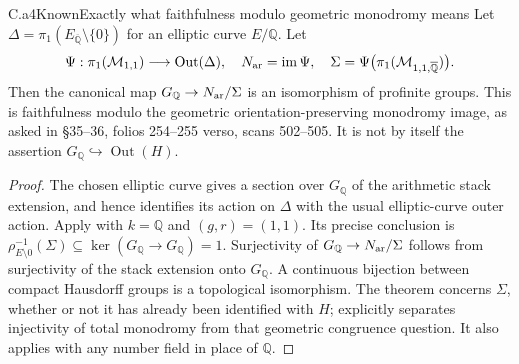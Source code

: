 \begin{claim}{C.a4}{Known}{Exactly what faithfulness modulo geometric monodromy means}
Let $\Delta=\pi_1(E_{\overline{\mathbb Q}}\setminus\{0\})$ for an
elliptic curve $E/\mathbb Q$. Let
\[
 \Psi:\pi_1(\mathcal M_{1,1})\longrightarrow\operatorname{Out}(\Delta),
 \quad N_{\rm ar}=\operatorname{im}\Psi,\quad
 \Sigma=\Psi\bigl(\pi_1(\mathcal M_{1,1,\overline{\mathbb Q}})\bigr).
\]
Then the canonical map $G_{\mathbb Q}\to N_{\rm ar}/\Sigma$ is an
isomorphism of profinite groups. This is faithfulness modulo the geometric
orientation-preserving monodromy image, as asked in \S35--36, folios
254--255 verso, scans 502--505. It is not by itself the assertion
$G_{\mathbb Q}\hookrightarrow\operatorname{Out}(H)$.
\end{claim}
\begin{proof}
The chosen elliptic curve gives a section over $G_{\mathbb Q}$ of the
arithmetic stack extension, and hence identifies its action on $\Delta$
with the usual elliptic-curve outer action. Apply
\citet[Corollary 6.4]{HM2011arith} with $k=\mathbb Q$ and $(g,r)=(1,1)$.
Its precise conclusion is
$\rho_{E\setminus0}^{-1}(\Sigma)\subseteq
\ker(G_{\mathbb Q}\to G_{\mathbb Q})=1$.
Surjectivity of $G_{\mathbb Q}\to N_{\rm ar}/\Sigma$ follows from
surjectivity of the stack extension onto $G_{\mathbb Q}$. A continuous
bijection between compact Hausdorff groups is a topological isomorphism.
The theorem concerns $\Sigma$, whether or not it has already been
identified with $H$; \citet[Corollary 6.5]{HM2011arith} explicitly
separates injectivity of total monodromy from that geometric congruence
question. It also applies with any number field in place of $\mathbb Q$.
\end{proof}

